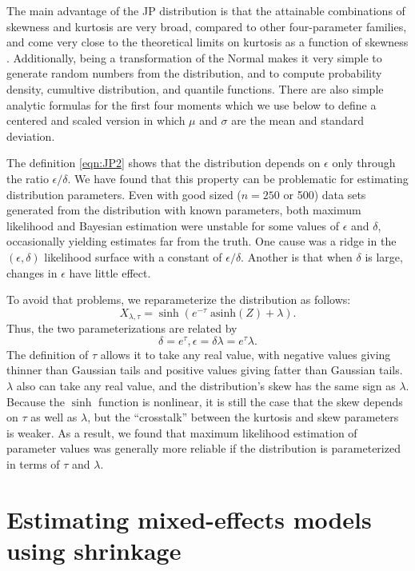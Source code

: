 \documentclass[11pt]{article}
\newcounter{box}
\newcommand{\be}{\begin{equation}}
\newcommand{\ee}{\end{equation}}
\begin{document}
{The main advantage of the JP distribution is that the attainable combinations of skewness and kurtosis are very broad, compared to other 
four-parameter families, and come very close to the theoretical limits on kurtosis as a function of skewness \citep[][Fig.  2]{jones-pewsey-2009}. 
Additionally, being a transformation of the Normal makes it very simple to generate random numbers from the distribution, and to compute 
probability density, cumultive distribution, and quantile functions. There are also simple analytic formulas for the first four moments
\citep[][p. 764]{jones-pewsey-2009} which we use below to define a centered and scaled version in which $\mu$ and $\sigma$ 
are the mean and standard deviation. 

The definition \eqref{eqn:JP2} shows that the distribution depends on $\epsilon$ only through the ratio $\epsilon/\delta$. We have found
that this property can be problematic for estimating distribution parameters. Even with good sized ($n=250$ or 500) data sets generated from the 
distribution with known parameters, both maximum likelihood and Bayesian estimation were unstable for some values of $\epsilon$ and $\delta$, 
occasionally yielding estimates far from the truth. One cause was a ridge in the $(\epsilon,\delta)$ likelihood surface with a constant of 
$\epsilon/\delta$. Another is that when $\delta$ is large,  changes in $\epsilon$ have little effect. 

To avoid that problems, we reparameterize the distribution as follows: 
\be
X_{\lambda,\tau} = \sinh \left( e^{-\tau} \; \mbox{asinh}(Z) + \lambda \right).
\label{eqn:SJP}
\ee
Thus, the two parameterizations are related by
\be
\delta = e^{\tau}, \epsilon= \delta \lambda =  e^{\tau} \lambda.
\ee
The definition of $\tau$ allows it to take any real value, with negative values giving thinner than Gaussian tails and positive
values giving fatter than Gaussian tails. $\lambda$ also can take any real value, and the distribution's skew has the same sign as $\lambda$. 
Because the $\sinh$ function is nonlinear, it is still the case that the skew depends on $\tau$ as well as $\lambda$, but the
``crosstalk'' between the kurtosis and skew parameters is weaker. As  a result, we found that maximum likelihood estimation of parameter values was 
generally more reliable if the distribution is parameterized in terms of $\tau$ and $\lambda$. 

\section{Estimating mixed-effects models using shrinkage}

}
\end{document}
